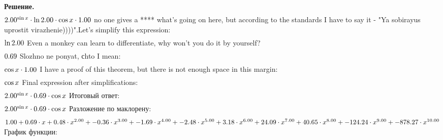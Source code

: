 \documentclass[12pt,a4paper]{extreport}
\theoremstyle{plain}
\theoremstyle{definition}
\newenvironment{solution}%
{\par\noindent\textbf{Решение. }}%
{\bigskip}
\begin{document}
\begin{solution}
\begin{gather}
\end{gather}
\begin{math}
2.00 ^ {\sin x }\cdot \ln 2.00 \cdot \cos x \cdot 1.00 \\
\end{math}
no one gives a **** what's going on here, but according to the standards I have to say it - "Ya sobirayus uprostit virazhenie))))".Let's simplify this expression: 
\begin{gather}
\end{gather}
\begin{math}
\ln 2.00 \\
\end{math}
Even a monkey can learn to differentiate, why won't you do it by yourself?
\begin{gather}
\end{gather}
\begin{math}
0.69 \\
\end{math}
Slozhno ne ponyat, сhto I mean: 
\begin{gather}
\end{gather}
\begin{math}
\cos x \cdot 1.00 \\
\end{math}
I have a proof of this theorem, but there is not enough space in this margin: 
\begin{gather}
\end{gather}
\begin{math}
\cos x \\
\end{math}
Final expression after simplifications:
\begin{gather}
\end{gather}
\begin{math}
2.00 ^ {\sin x }\cdot 0.69 \cdot \cos x \\
\end{math}
Итоговый ответ: 
\begin{gather}
\end{gather}
\begin{math}
2.00 ^ {\sin x }\cdot 0.69 \cdot \cos x \\
\end{math}
Разложение по маклорену: 
\begin{gather}
\end{gather}
\begin{math}
1.00 + 0.69 \cdot x + 0.48 \cdot x ^ {2.00 }+ -0.36 \cdot x ^ {3.00 }+ -1.69 \cdot x ^ {4.00 }+ -2.48 \cdot x ^ {5.00 }+ 3.18 \cdot x ^ {6.00 }+ 24.09 \cdot x ^ {7.00 }+ 40.65 \cdot x ^ {8.00 }+ -124.24 \cdot x ^ {9.00 }+ -878.27 \cdot x ^ {10.00 }\\
\end{math}
График функции:


\end{solution}
\end{document}
